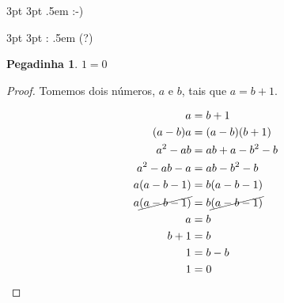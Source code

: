 {3pt} %
{3pt} %
{\itshape} %
{} %
{\bfseries} %
{} %
{.5em} %
{ :-)\space} %

{3pt} %
{3pt} %
{\itshape} %
{} %
{\bfseries} %
{:} %
{.5em} %
{\space(?)} %

\enlargethispage{\baselineskip}

\theoremstyle{smile} %
\newtheorem{absurd}{Pegadinha}

\begin{absurd}\label{thm:doisum}
  $1=0$
\end{absurd}

\begin{proof}
Tomemos dois números, $a$ e $b$, tais que $a=b+1$.

\begin{displaymath}
  \begin{split}
    a &= b+1 \\
    (a-b)a &= (a-b)(b+1) \\
    a^2 - ab &= ab + a -b^2 -b \\
    a^2 -ab -a &= ab -b^2 -b \\
    a(a-b-1) &= b(a-b-1) \\
    a \cancel{(a-b-1)} &= b \cancel{(a-b-1)} \\
    a &= b \\
    b+1 &= b \\
    1 &= b-b \\
    1 &= 0
  \end{split}
\end{displaymath}
\end{proof}

\theoremstyle{plain} %
\newtheorem{theorem}{Teorema}

